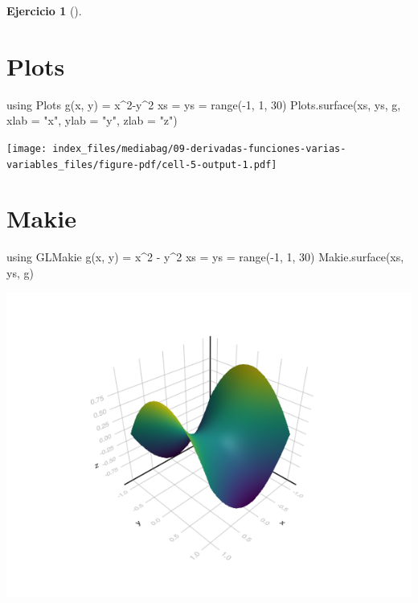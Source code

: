 \documentclass[
  a4paper,
]{scrreport}
\newenvironment{Shaded}{\begin{snugshade}}{\end{snugshade}}
\newcommand{\BuiltInTok}[1]{\textcolor[rgb]{0.00,0.23,0.31}{#1}}
\newcommand{\FloatTok}[1]{\textcolor[rgb]{0.68,0.00,0.00}{#1}}
\newcommand{\FunctionTok}[1]{\textcolor[rgb]{0.28,0.35,0.67}{#1}}
\newcommand{\ImportTok}[1]{\textcolor[rgb]{0.00,0.46,0.62}{#1}}
\newcommand{\NormalTok}[1]{\textcolor[rgb]{0.00,0.23,0.31}{#1}}
\newcommand{\OperatorTok}[1]{\textcolor[rgb]{0.37,0.37,0.37}{#1}}
\newcommand{\StringTok}[1]{\textcolor[rgb]{0.13,0.47,0.30}{#1}}
\theoremstyle{definition}
\newtheorem{exercise}{Ejercicio}[chapter]
\theoremstyle{remark}
\begin{document}
\begin{exercise}[]
\begin{enumerate}
\begin{tcolorbox}
  \section{Plots}

\begin{Shaded}
\begin{Highlighting}[]
\ImportTok{using} \BuiltInTok{Plots}
\FunctionTok{g}\NormalTok{(x, y) }\OperatorTok{=}\NormalTok{ x}\OperatorTok{\^{}}\FloatTok{2}\OperatorTok{{-}}\NormalTok{y}\OperatorTok{\^{}}\FloatTok{2}
\NormalTok{xs }\OperatorTok{=}\NormalTok{ ys }\OperatorTok{=} \FunctionTok{range}\NormalTok{(}\OperatorTok{{-}}\FloatTok{1}\NormalTok{, }\FloatTok{1}\NormalTok{, }\FloatTok{30}\NormalTok{)}
\NormalTok{Plots.}\FunctionTok{surface}\NormalTok{(xs, ys, g, xlab }\OperatorTok{=} \StringTok{"x"}\NormalTok{, ylab }\OperatorTok{=} \StringTok{"y"}\NormalTok{, zlab }\OperatorTok{=} \StringTok{"z"}\NormalTok{)}
\end{Highlighting}
\end{Shaded}

  \texttt{[image: index\_files/mediabag/09-derivadas-funciones-varias-variables\_files/figure-pdf/cell-5-output-1.pdf]}

  \section{Makie}

\begin{Shaded}
\begin{Highlighting}[]
\ImportTok{using} \BuiltInTok{GLMakie}
\FunctionTok{g}\NormalTok{(x, y) }\OperatorTok{=}\NormalTok{ x}\OperatorTok{\^{}}\FloatTok{2} \OperatorTok{{-}}\NormalTok{ y}\OperatorTok{\^{}}\FloatTok{2}
\NormalTok{xs }\OperatorTok{=}\NormalTok{ ys }\OperatorTok{=} \FunctionTok{range}\NormalTok{(}\OperatorTok{{-}}\FloatTok{1}\NormalTok{, }\FloatTok{1}\NormalTok{, }\FloatTok{30}\NormalTok{)}
\NormalTok{Makie.}\FunctionTok{surface}\NormalTok{(xs, ys, g)}
\end{Highlighting}
\end{Shaded}

  \includegraphics{09-derivadas-funciones-varias-variables_files/figure-pdf/cell-6-output-1.png}


\end{tcolorbox}
\end{enumerate}
\end{exercise}
\end{document}
